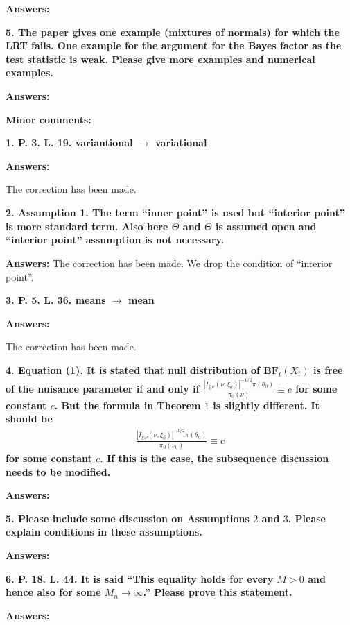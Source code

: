 \documentclass[11pt]{article}
\theoremstyle{plain}
\theoremstyle{definition}
\theoremstyle{remark}
\begin{document}
\textbf{Answers:}


\textbf{
    5. The paper gives one example (mixtures of normals) for which the LRT fails. One example for the argument for the Bayes factor as the test statistic is weak. Please give more examples and numerical examples.
}

\textbf{Answers:}


\textbf{Minor comments:}

\textbf{
1. 
P. 3. L. 19. variantional $\rightarrow$ variational
}

\textbf{Answers:}

The correction has been made.

\textbf{
2. Assumption 1. The term ``inner point'' is used but ``interior point'' is more standard term.
Also here $\Theta$ and $\tilde \Theta$ is assumed open and ``interior point'' assumption is not necessary.
}

\textbf{Answers:}
The correction has been made.
We drop the condition of ``interior point''.

\textbf{
    3. P. 5. L. 36. means $\rightarrow$ mean
}

\textbf{Answers:}

The correction has been made.



\textbf{
4.
Equation (1).
It is stated that null distribution of $\textbf{BF}_t(X_t)$ is free of the nuisance parameter if and only if $\frac{\left| I_{\xi | \nu} (\nu, \xi_0) \right|^{-1/2} \pi(\theta_0) }{\pi_0(\nu)} \equiv c$ for some constant $c$. But the formula in Theorem $1$ is slightly different.
It should be
\begin{align*}
\frac{\left| I_{\xi | \nu} (\nu, \xi_0) \right|^{-1/2} \pi(\theta_0) }{\pi_0(\nu_0)} \equiv c
\end{align*}
for some constant $c$.
If this is the case, the subsequence discussion needs to be modified.
}

\textbf{Answers:}


\textbf{
5.
Please include some discussion on Assumptions $2$ and $3$.
Please explain conditions in these assumptions.
}


\textbf{Answers:}



\textbf{
6.
P. 18. L. 44.
It is said ``This equality holds for every $M>0$ and hence also for some $M_n \to \infty$.''
Please prove this statement.
}


\textbf{Answers:}
\end{document}
